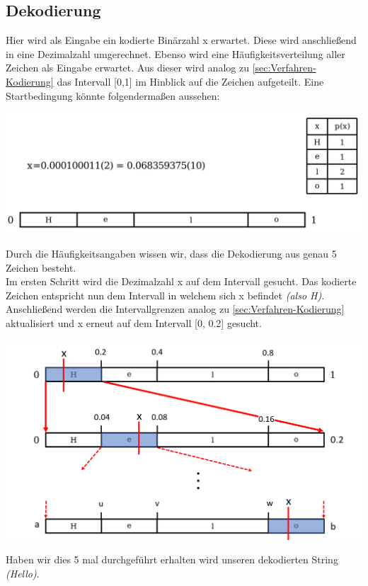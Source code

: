 \documentclass[a4paper]{article}
\theoremstyle{definition}
\theoremstyle{remark}
\begin{document}
\subsection{Dekodierung}
Hier wird als Eingabe ein kodierte Binärzahl x erwartet. Diese wird anschließend in eine Dezimalzahl umgerechnet. Ebenso wird eine Häufigkeitsverteilung aller Zeichen als Eingabe erwartet. Aus dieser wird analog zu \ref{sec:Verfahren-Kodierung} das Intervall [0,1] im Hinblick auf die Zeichen aufgeteilt. Eine Startbedingung könnte folgendermaßen aussehen:
\begin{center}
\includegraphics[scale=0.4]{dec-schritt1}
\end{center}
Durch die Häufigkeitsangaben wissen wir, dass die Dekodierung aus genau 5 Zeichen besteht.\\
Im ersten Schritt wird die Dezimalzahl x auf dem Intervall gesucht. Das kodierte Zeichen entspricht nun dem Intervall in welchem sich x befindet \textit{(also H)}.
\\
Anschließend werden die Intervallgrenzen analog zu \ref{sec:Verfahren-Kodierung}
aktualisiert und x erneut auf dem Intervall [0, 0.2] gesucht.
\begin{center}
\includegraphics[scale=0.5]{dec-schritt2}
\end{center}
Haben wir dies 5 mal durchgeführt erhalten wird unseren dekodierten String \textit{(Hello)}.
\newpage
\end{document}
